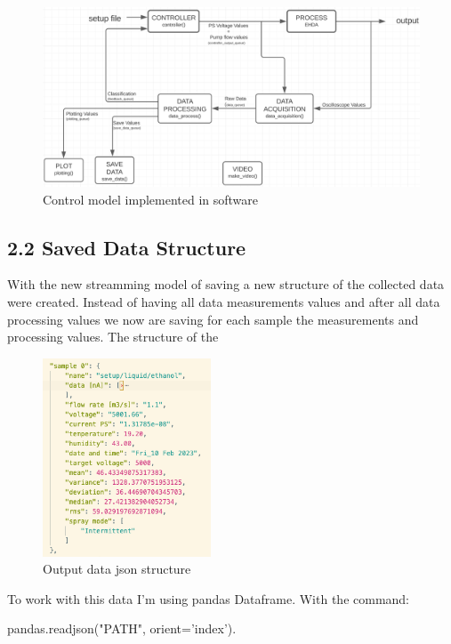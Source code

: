     \begin{figure}[H]
        \center
        \includegraphics[width=18cm]{images/image_folder_report_4/control_loop.png}
        \caption{Control model implemented in software}
    \end{figure}


\subsection*{2.2 Saved Data Structure}

    With the new streamming model of saving a new structure of the collected data were created.
    Instead of having all data measurements values and after all data processing values we now are saving for each sample the measurements and processing values.
    The structure of the 

    \begin{figure}[H]
        \center
        \includegraphics[width=5cm]{images/image_folder_report_4/json_structure.png}
        \caption{Output data json structure}
    \end{figure}

    To work with this data I'm using pandas Dataframe.
    With the command:
    
    pandas.read\textunderscore{}json("PATH", orient='index').

